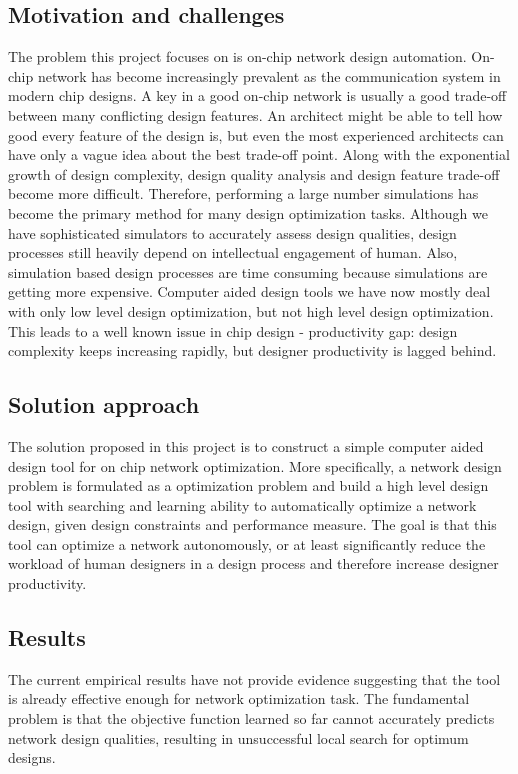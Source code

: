 \documentclass[12pt]{article}
\theoremstyle{definition}
\begin{document}
\subsection{Motivation and challenges}
The problem this project focuses on is on-chip network design automation. On-chip network has become increasingly prevalent as the communication system in modern chip designs. A key in a good on-chip network is usually a good trade-off between many conflicting design features. An architect might be able to tell how good every feature of the design is, but even the most experienced architects can have only a vague idea about the best trade-off point. Along with the exponential growth of design complexity, design quality analysis and design feature trade-off become more difficult. Therefore, performing a large number simulations has become the primary method for many design optimization tasks. Although we have sophisticated simulators \cite{amoretti2014modeling} \cite{jiang2013detailed} to accurately assess design qualities, design processes still heavily depend on intellectual engagement of human. Also, simulation based design processes are time consuming because simulations are getting more expensive. Computer aided design tools we have now mostly deal with only low level design optimization, but not high level design optimization. This leads to a well known issue in chip design - productivity gap: design complexity keeps increasing rapidly, but designer productivity is lagged behind.
\subsection{Solution approach}
The solution proposed in this project is to construct a simple computer aided design tool for on chip network optimization. More specifically, a network design problem is formulated as a optimization problem and build a high level design tool with searching \cite{ganguly2011scalable} and learning ability to automatically optimize a network design, given design constraints and performance measure. The goal is that this tool can optimize a network autonomously, or at least significantly reduce the workload of human designers in a design process and therefore increase designer productivity.
\subsection{Results}
The current empirical results have not provide evidence suggesting that the tool is already effective enough for network optimization task. The fundamental problem is that the objective function learned so far cannot accurately predicts network design qualities, resulting in unsuccessful local search for optimum designs.
\end{document}
